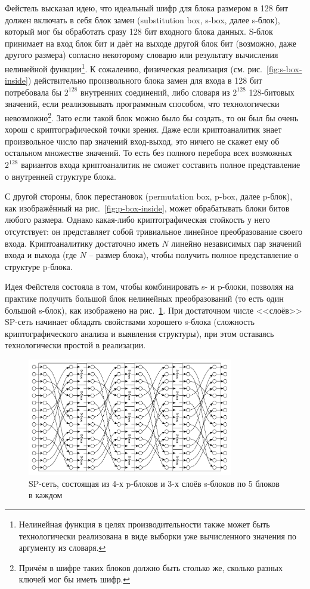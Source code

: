 Фейстель высказал идею, что идеальный шифр для блока размером в 128 бит должен включать в себя блок замен (substitution box, s-box, далее s-блок), который мог бы обработать сразу 128 бит входного блока данных. S-блок принимает на вход блок бит и даёт на выходе другой блок бит (возможно, даже другого размера) согласно некоторому словарю или результату вычисления нелинейной функции\footnote{Нелинейная функция в целях производительности также может быть технологически реализована в виде выборки уже вычисленного значения по аргументу из словаря.}. К сожалению, физическая реализация (см. рис.~\ref{fig:s-box-inside}) действительно произвольного блока замен для входа в 128 бит потребовала бы $2^{128}$ внутренних соединений, либо словаря из $2^{128}$ 128-битовых значений, если реализовывать программным способом, что технологически невозможно\footnote{Причём в шифре таких блоков должно быть столько же, сколько разных ключей мог бы иметь шифр.}. Зато если такой блок можно было бы создать, то он был бы очень хорош с криптографической точки зрения. Даже если криптоаналитик знает произвольное число пар значений вход-выход, это ничего не скажет ему об остальном множестве значений. То есть без полного перебора всех возможных $2^{128}$ вариантов входа криптоаналитик не сможет составить полное представление о внутренней структуре блока.

С другой стороны, блок перестановок (permutation box, p-box, далее p-блок), как изображённый на рис.~\ref{fig:p-box-inside}, может обрабатывать блоки битов любого размера. Однако какая-либо криптографическая стойкость у него отсутствует: он представляет собой тривиальное линейное преобразование своего входа. Криптоаналитику достаточно иметь $N$ линейно независимых пар значений входа и выхода (где $N$ -- размер блока), чтобы получить полное представление о структуре p-блока.

Идея Фейстеля состояла в том, чтобы комбинировать s- и p-блоки, позволяя на практике получить большой блок нелинейных преобразований (то есть один большой s-блок), как изображено на рис.~\ref{fig:sp-network}. При достаточном числе <<слоёв>> SP-сеть начинает обладать свойствами хорошего s-блока (сложность криптографического анализа и выявления структуры), при этом оставаясь технологически простой в реализации.

\begin{figure}[htb]
	\centering
	\includegraphics[width=0.8\textwidth]{pic/sp-network}
  \caption{SP-сеть, состоящая из 4-х p-блоков и 3-х слоёв s-блоков по 5 блоков в каждом}
  \label{fig:sp-network}
\end{figure}

